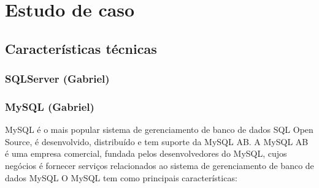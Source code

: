 \documentclass[conference]{IEEEtran}
\begin{document}
\section{Estudo de caso}
  \subsection{Características técnicas}
    \subsubsection{SQLServer (Gabriel)}
    \subsubsection{MySQL (Gabriel)}
	MySQL é o mais popular sistema de gerenciamento de banco de dados SQL Open Source, é desenvolvido, distribuído e tem suporte da MySQL AB. A MySQL AB é uma empresa comercial, fundada pelos desenvolvedores do MySQL, cujos negócios é fornecer serviços relacionados ao sistema de gerenciamento de banco de dados MySQL
	O MySQL tem como principais características:
\end{document}
